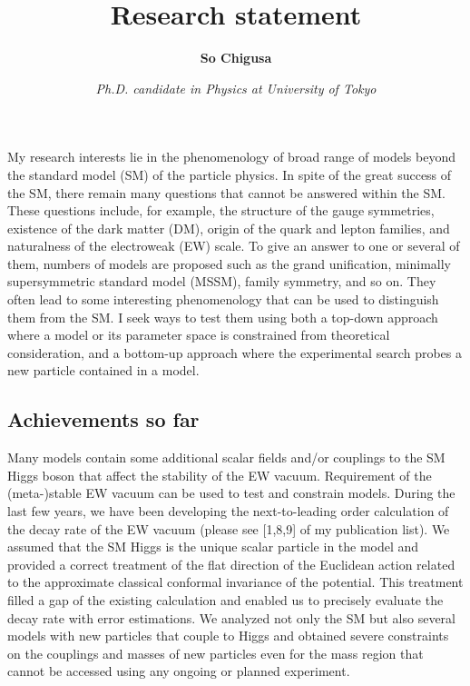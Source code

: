\documentclass[12pt,notitlepage]{book}
\title{\vspace*{-3cm}Research statement}
\author{\textbf{So Chigusa}}
\date{\vspace*{-4mm}\textit{Ph.D. candidate in Physics at University of Tokyo}}
\begin{document}
\maketitle

My research interests lie in the phenomenology of broad range of models beyond the standard model (SM) of the particle physics.
In spite of the great success of the SM, there remain many questions that cannot be answered within the SM.
These questions include, for example, the structure of the gauge symmetries, existence of the dark matter (DM), origin of the quark and lepton families, and naturalness of the electroweak (EW) scale.
To give an answer to one or several of them, numbers of models are proposed such as the grand unification, minimally supersymmetric standard model (MSSM), family symmetry, and so on.
They often lead to some interesting phenomenology that can be used to distinguish them from the SM.
I seek ways to test them using both a top-down approach where a model or its parameter space is constrained from theoretical consideration, and a bottom-up approach where the experimental search probes a new particle contained in a model.

\vspace*{-2mm}
\subsection*{Achievements so far}


Many models contain some additional scalar fields and/or couplings to the SM Higgs boson that affect the stability of the EW vacuum.
Requirement of the (meta-)stable EW vacuum can be used to test and constrain models.
During the last few years, we have been developing the next-to-leading order calculation of the decay rate of the EW vacuum (please see [1,8,9] of my publication list).
We assumed that the SM Higgs is the unique scalar particle in the model and provided a correct treatment of the flat direction of the Euclidean action related to the approximate classical conformal invariance of the potential.
This treatment filled a gap of the existing calculation and enabled us to precisely evaluate the decay rate with error estimations.
We analyzed not only the SM but also several models with new particles that couple to Higgs and obtained severe constraints on the couplings and masses of new particles even for the mass region that cannot be accessed using any ongoing or planned experiment.
\end{document}
